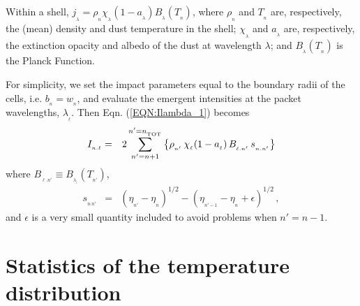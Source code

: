 \documentclass[usenatbib]{mn2e}
\numberwithin{equation}{section}
\begin{document}
Within a shell, $j_{_\lambda}=\rho_{_n}\chi_{_\lambda}(1-a_{_\lambda})B_{_\lambda}\!(T_{_n})$, where $\rho_{_n}$ and $T_{_n}$ are, respectively, the (mean) density and dust temperature in the shell; $\chi_{_\lambda}$ and $a_{_\lambda}$ are, respectively, the extinction opacity and albedo of the dust at wavelength $\lambda$; and $B_{_\lambda}\!(T_{_n})$ is the Planck Function.

For simplicity, we set the impact parameters equal to the boundary radii of the cells, i.e. $b_{_n}=w_{_n}$, and evaluate the emergent intensities at the packet wavelengths, $\lambda_{_\ell}$. Then Eqn. (\ref{EQN:Ilambda_1}) becomes
\begin{eqnarray}\label{EQN:Ilambda_2}
I_{_{n.\ell}}&=&2\sum\limits_{n'=n+1}^{n'=n_{_{\rm TOT}}}\left\{\rho_{_{n'}}\,\chi_{_\ell}(1-a_{_\ell})\,B_{_{\ell.n'}}\,s_{_{n.n'}}\right\}
\end{eqnarray}
where $B_{_{\ell.n'}}\equiv B_{_{\lambda_{_\ell}}}\!(T_{_{n'}})$,
\begin{eqnarray}
s_{_{n.n'}}&=&(\eta_{_{n'}}-\eta_{_n})^{1/2}-(\eta_{_{n'-1}}-\eta_{_n}+\epsilon)^{1/2}\,,
\end{eqnarray}
and $\epsilon$ is a very small quantity included to avoid problems when $n'=n-1$.





\section{Statistics of the temperature distribution}
\end{document}
